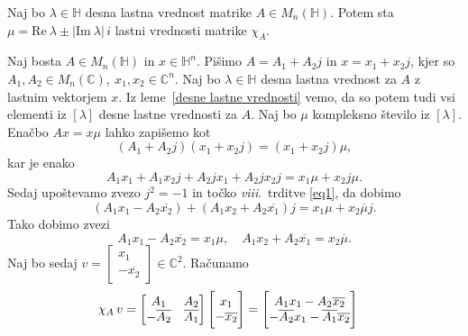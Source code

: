 \documentclass[mat1, tisk]{fmfdelo}
\numberwithin{equation}{section}
\begin{document}
\begin{lema}\label{lastne vrednosti konjugiranke}
    Naj bo $\lambda \in \mathbb{H}$ desna lastna vrednost matrike $A \in M_{n}(\mathbb{H})$. Potem sta $\mu = \mathrm{Re} \: \lambda \pm 
    |\mathrm{Im} \: \lambda| \, i$ lastni vrednosti matrike $\chi_A$.
\end{lema}

\begin{dokaz}
    Naj bosta $A \in M_{n}(\mathbb{H})$ in $x \in \mathbb{H}^{n}$. Pišimo $A = A_1 + A_2j$ in $x = x_1 + x_2j$, kjer so 
    $A_1, A_2 \in M_{n}(\mathbb{C}), \: x_1, x_2 \in \mathbb{C}^n$. Naj bo $\lambda \in \mathbb{H}$ desna lastna vrednost
    za $A$ z lastnim vektorjem $x$. Iz leme~\ref{desne lastne vrednosti} vemo, da so potem tudi vsi elementi iz $[\lambda]$ desne lastne vrednosti
    za $A$. Naj bo $\mu$ kompleksno število iz $[\lambda]$.
    Enačbo $Ax = x\mu$ lahko zapišemo kot
    $$(A_1 + A_2j)(x_1 + x_2j) = (x_1 + x_2j)\mu,$$
    kar je enako
    $$A_1x_1 + A_1x_2j + A_2jx_1 + A_2jx_2j = x_1\mu + x_2j\mu.$$
    Sedaj upoštevamo zvezo $j^2 = -1$ in točko \textit{viii}.\ trditve \ref{eq1}, da dobimo
    $$(A_1x_1 - A_2\overline{x_2}) + (A_1 x_2 + A_2 \overline{x_1})j = x_1 \mu + x_2 \overline{\mu}j.$$
    Tako dobimo zvezi
    $$A_1x_1 - A_2\overline{x_2} = x_1 \mu, \quad
            A_1 x_2 + A_2 \overline{x_1} = x_2 \overline{\mu}.$$
    Naj bo sedaj $v = 
    \begin{bmatrix}
        x_1\\
        - \overline{x_2}
    \end{bmatrix}
    \in \mathbb{C}^2$. Računamo 
    \begin{equation*}
        \setlength{\jot}{10pt}
        \begin{aligned}
            \chi_A \, v =
            \begin{bmatrix}
                A_{1} & A_{2}\\
                - \overline{A_{2}} & \overline{A_{1}} 
            \end{bmatrix}
            \Bigg[\begin{matrix}
                x_1\\
                - \overline{x_2}
            \end{matrix}\Bigg]
            &= 
            \Bigg[\begin{matrix}
                A_1x_1 - A_2\overline{x_2}\\
                - \overline{A_2} x_1 - \overline{A_1} \overline{x_2}
            \end{matrix}\Bigg]

\end{aligned}
\end{equation*}
\end{dokaz}
\end{document}

